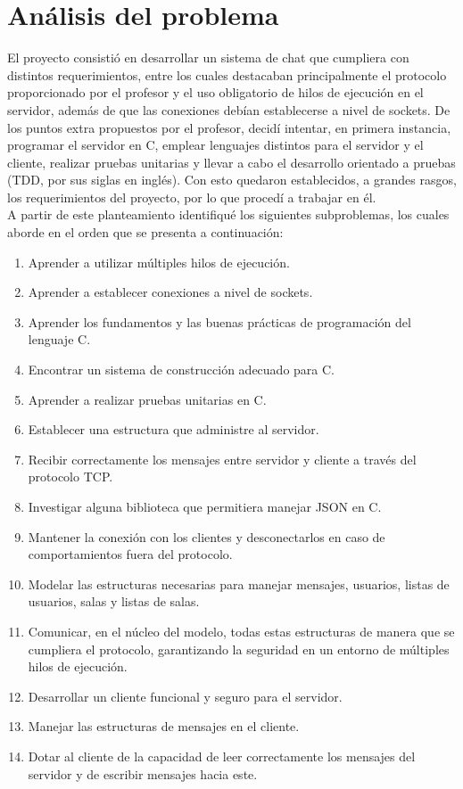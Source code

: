 \documentclass{article}
\begin{document}
    \section{Análisis del problema}

    El proyecto consistió en desarrollar un sistema de chat que cumpliera con distintos requerimientos, entre los cuales destacaban principalmente el protocolo proporcionado por el profesor y el uso obligatorio de hilos de ejecución en el servidor, además de que las conexiones debían establecerse a nivel de sockets. De los puntos extra propuestos por el profesor, decidí intentar, en primera instancia, programar el servidor en C, emplear lenguajes distintos para el servidor y el cliente, realizar pruebas unitarias y llevar a cabo el desarrollo orientado a pruebas (TDD, por sus siglas en inglés). Con esto quedaron establecidos, a grandes rasgos, los requerimientos del proyecto, por lo que procedí a trabajar en él.\\

    A partir de este planteamiento identifiqué los siguientes subproblemas, los cuales aborde en el orden que se presenta a continuación:

    \begin{enumerate}
        \item Aprender a utilizar múltiples hilos de ejecución.
        \item Aprender a establecer conexiones a nivel de sockets.
        \item Aprender los fundamentos y las buenas prácticas de programación del lenguaje C.
        \item Encontrar un sistema de construcción adecuado para C.
        \item Aprender a realizar pruebas unitarias en C.
        \item Establecer una estructura que administre al servidor.
        \item Recibir correctamente los mensajes entre servidor y cliente a través del protocolo TCP.
        \item Investigar alguna biblioteca que permitiera manejar JSON en C.
        \item Mantener la conexión con los clientes y desconectarlos en caso de comportamientos fuera del protocolo.
        \item Modelar las estructuras necesarias para manejar mensajes, usuarios, listas de usuarios, salas y listas de salas.
        \item Comunicar, en el núcleo del modelo, todas estas estructuras de manera que se cumpliera el protocolo, garantizando la seguridad en un entorno de múltiples hilos de ejecución.
        \item Desarrollar un cliente funcional y seguro para el servidor.
        \item Manejar las estructuras de mensajes en el cliente.
        \item Dotar al cliente de la capacidad de leer correctamente los mensajes del servidor y de escribir mensajes hacia este.
    \end{enumerate}
\end{document}
